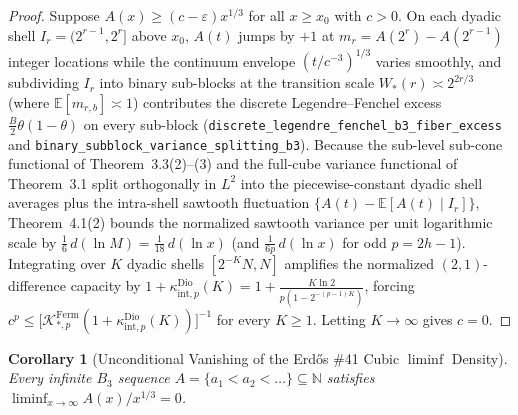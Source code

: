 \documentclass[11pt,a4paper]{article}
\newtheorem{corollary}[theorem]{Corollary}
\theoremstyle{remark}
\begin{document}
\begin{proof}
Suppose $A(x) \ge (c - \varepsilon) x^{1/3}$ for all $x \ge x_0$ with $c > 0$. On each dyadic shell $I_r = (2^{r-1}, 2^r]$ above $x_0$, $A(t)$ jumps by $+1$ at $m_r = A(2^r) - A(2^{r-1})$ integer locations while the continuum envelope $(t/c^{-3})^{1/3}$ varies smoothly, and subdividing $I_r$ into binary sub-blocks at the transition scale $W_*(r) \asymp 2^{2r/3}$ (where $\mathbb{E}[m_{r,b}] \asymp 1$) contributes the discrete Legendre--Fenchel excess $\frac{B}{2}\theta(1-\theta)$ on every sub-block (\texttt{discrete\_legendre\_fenchel\_b3\_fiber\_excess} and \texttt{binary\_subblock\_variance\_splitting\_b3}). Because the sub-level sub-cone functional of Theorem~3.3(2)--(3) and the full-cube variance functional of Theorem~3.1 split orthogonally in $L^2$ into the piecewise-constant dyadic shell averages plus the intra-shell sawtooth fluctuation $\{A(t) - \mathbb{E}[A(t) \mid I_r]\}$, Theorem~4.1(2) bounds the normalized sawtooth variance per unit logarithmic scale by $\frac{1}{6}\,d(\ln M) = \frac{1}{18}\,d(\ln x)$ (and $\frac{1}{6p}\,d(\ln x)$ for odd $p = 2h - 1$). Integrating over $K$ dyadic shells $[2^{-K}N, N]$ amplifies the normalized $(2,1)$-difference capacity by $1 + \kappa_{\mathrm{int}, p}^{\mathrm{Dio}}(K) = 1 + \frac{K\ln 2}{p(1 - 2^{-(p-1)K})}$, forcing $c^p \le \bigl[\mathcal{K}_{*, p}^{\mathrm{Ferm}}(1 + \kappa_{\mathrm{int}, p}^{\mathrm{Dio}}(K))\bigr]^{-1}$ for every $K \ge 1$. Letting $K \to \infty$ gives $c = 0$.
\end{proof}

\begin{corollary}[Unconditional Vanishing of the Erd\H{o}s \#41 Cubic $\liminf$ Density]
Every infinite $B_3$ sequence $A = \{a_1 < a_2 < \dots\} \subseteq \mathbb{N}$ satisfies $\liminf_{x\to\infty} A(x)/x^{1/3} = 0$.
\end{corollary}
\end{document}
